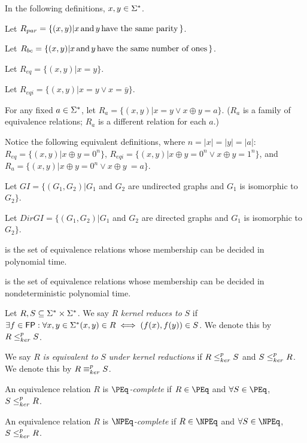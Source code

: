 In the following definitions, $x,y\in\Sigma^{*}$.

Let $R_{par}=\{(x, y)|x \,\text{and}\, y \,\text{have the same parity}\,\}$.

Let $R_{bc}=\{(x, y)|x \,\text{and}\, y \,\text{have the same number of ones}\,\}$.

Let $R_{eq}=\{(x, y)|x = y\}$.

Let $R_{eqi}=\{(x, y)|x = y \lor x = \bar{y}\}$.

For any fixed $a\in\Sigma^{*}$, let $R_{a}=\{(x, y)|x = y \lor x \oplus y =
a\}$. ($R_{a}$ is a family of equivalence relations; $R_{a}$ is a different
relation for each $a$.)

Notice the following equivalent definitions, where $n=|x|=|y|=|a|$:
$R_{eq}=\{(x, y)|x \oplus y = 0^n\}$, $R_{eqi}=\{(x, y)|x \oplus y = 0^n \lor
x\oplus y = 1^n\}$, and $R_{a}=\{(x,y)|x \oplus y = 0^n \lor x \oplus y\ =
a\}$.

Let $GI=\{(G_1, G_2)|G_1$ and $G_2$ are undirected graphs and $G_1$ is
isomorphic to $G_2\}$.

Let $DirGI=\{(G_1, G_2)|G_1$ and $G_2$ are directed graphs and $G_1$ is
isomorphic to $G_2\}$.

\begin{definition}\label{def:peq}
  \textit{\PEq} is the set of equivalence relations whose membership can be
  decided in polynomial time.

  \textit{\NPEq} is the set of equivalence relations whose membership can be
  decided in nondeterministic polynomial time.
\end{definition}

\begin{definition}\label{def:kr}
  Let $R,S\subseteq\Sigma^{*}\times\Sigma^{*}$. We say $R$ \textit{kernel
  reduces to} $S$ if $\exists f\in{\ensuremath{\mathsf{FP}}}:\forall x,y\in\Sigma^{*} (x, y)\in R \iff
  (f(x),f(y))\in S$. We denote this by $R\leq^{p}_{ker} S$.
  
  We say $R$ \textit{is equivalent to} $S$ \textit{under kernel
  reductions} if $R\leq^{p}_{ker} S$ and $S\leq^{p}_{ker} R$. We denote this by $R\equiv^{p}_{ker}
  S$.
\end{definition}

\begin{definition}\label{def:kernel_complete}
  An equivalence relation $R$ is \textit{$\PEq$-complete} if $R\in\PEq$ and
  $\forall S\in\PEq$, $S\leq^{p}_{ker} R$.

  An equivalence relation $R$ is \textit{$\NPEq$-complete} if $R\in\NPEq$ and
  $\forall S\in\NPEq$, $S\leq^{p}_{ker} R$.
\end{definition}
